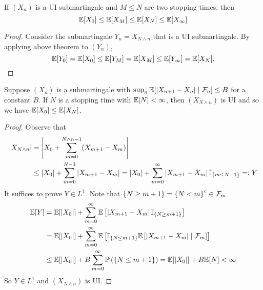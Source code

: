 \begin{cor}
    If $(X_n)$ is a UI submartingale and $M \leq N$ are two stopping times, then
    \begin{equation*}
        \mathbb{E}[X_0] \leq \mathbb{E}[X_M] \leq \mathbb{E}[X_N] \leq \mathbb{E}[X_\infty]
    \end{equation*}
\end{cor}
\begin{proof}
    Consider the submartingale $Y_n = X_{N \wedge n}$ that is a UI submartingale. By applying above theorem to $(Y_n)$,
    \begin{equation*}
        \mathbb{E}[Y_0] = \mathbb{E}[X_0] \leq \mathbb{E}[Y_M] = \mathbb{E}[X_M] \leq \mathbb{E}[Y_\infty] = \mathbb{E}[X_N]. \qedhere
    \end{equation*}
\end{proof}

\begin{thm}
    Suppose $(X_n)$ is a submartingale with $\sup_n\mathbb{E}[\left\lvert X_{n+1} - X_n\right\lvert \mid \mathcal{F}_n] \leq B$ for a constant $B$. If $N$ is a stopping time with $\mathbb{E}[N] < \infty$, then $(X_{N\wedge n})$ is UI and so we have $\mathbb{E}[X_0] \leq \mathbb{E}[X_N]$.
\end{thm}
\begin{proof}
    Observe that
    \begin{equation*}
        \begin{aligned}
            \left\lvert X_{N \wedge n}\right\lvert &= \left\lvert X_0 + \sum_{m=0}^{N\wedge n - 1} (X_{m+1} - X_m)\right\lvert \\
            &\leq \left\lvert X_0\right\lvert+ \sum_{m=0}^{N-1} \left\lvert X_{m+1} - X_m\right\lvert = \left\lvert X_0\right\lvert+ \sum_{m=0}^{\infty} \left\lvert X_{m+1} - X_m\right\lvert\mathbb{I}_{\left\{m \leq N-1\right\}} =\vcentcolon Y
        \end{aligned}
    \end{equation*}
    It suffices to prove $Y \in L^1$. Note that $\left\{N \geq m+1\right\} = \left\{N < m\right\}^c \in \mathcal{F}_{m}$
    \begin{equation*}
        \begin{aligned}
            \mathbb{E}[Y] &= \mathbb{E}[\left\lvert X_0\right\lvert]+\sum_{m=0}^{\infty} \mathbb{E}\left[\left\lvert X_{m+1} - X_m\right\lvert\mathbb{I}_{\left\{N \geq m+1\right\}}\right] \\
            &= \mathbb{E}[\left\lvert X_0\right\lvert]+\sum_{m=0}^{\infty} \mathbb{E}\left[\mathbb{I}_{\left\{N \leq m+1\right\}}\mathbb{E}\left[\left\lvert X_{m+1} - X_m\right\lvert \mid \mathcal{F}_m\right]\right]\\
            &\leq \mathbb{E}[\left\lvert X_0\right\lvert]+B\sum_{m=0}^{\infty} \mathbb{P}\left(\left\{N \leq m+1\right\}\right) = \mathbb{E}[\left\lvert X_0\right\lvert]+B \mathbb{E}[N] < \infty\\
        \end{aligned}
    \end{equation*}
    So $Y \in L^1$ and $(X_{N\wedge n})$ is UI. \qedhere
\end{proof}

